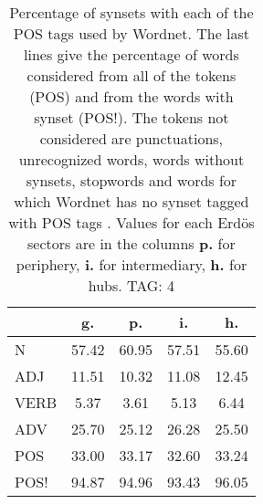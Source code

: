 \begin{table}[h!]
\begin{center}
\begin{tabular}{| l || c | c | c | c |}\hline
 & {\bf g.} & {\bf p.} & {\bf i.} & {\bf h.} \\\hline\hline
N & 57.42  & 60.95  & 57.51  & 55.60 \\\hline
ADJ & 11.51  & 10.32  & 11.08  & 12.45 \\\hline
VERB & 5.37  & 3.61  & 5.13  & 6.44 \\\hline
ADV & 25.70  & 25.12  & 26.28  & 25.50 \\\hline\hline
POS & 33.00  & 33.17  & 32.60  & 33.24 \\\hline
POS! & 94.87  & 94.96  & 93.43  & 96.05 \\\hline
\end{tabular}
\caption{Percentage of synsets with each of the POS tags used by Wordnet. The last lines give the percentage of words considered from all of the tokens (POS) and from the words with synset (POS!). The tokens not considered are punctuations, unrecognized words, words without synsets, stopwords and words for which Wordnet has no synset  tagged with POS tags . Values for each Erd\"os sectors are in the columns {{\bf p.}} for periphery, {{\bf i.}} for intermediary, {{\bf h.}} for hubs. TAG: 4}
\end{center}
\end{table}